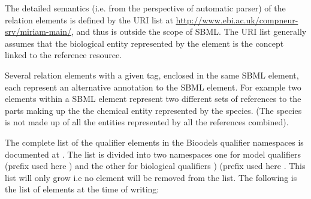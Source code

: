 The detailed semantics (i.e. from the perspective of automatic
parser) of the relation elements is defined by the URI list at
\url{http://www.ebi.ac.uk/compneur-srv/miriam-main/}, and thus is outside the
scope of SBML. The URI list generally assumes that the biological
entity represented by the element is the concept linked to the
reference resource.

Several relation elements with a given tag, enclosed in the same
SBML element, each represent an alternative annotation to the SBML
element. For example two  elements within a
\Species SBML element represent two different sets of
references to the parts making up the the chemical entity
represented by the species. (The species is not made up of all the
entities represented by all the references combined).

The complete list of the qualifier elements in the Bioodels
qualifier namespaces is documented at
. The list is
divided into two namespaces one for model qualifiers
 (prefix used here
) and the other for biological qualifiers
) (prefix used here
.  This list will only grow i.e no element will be
removed from the list. The following is the list of elements at
the time of writing:



